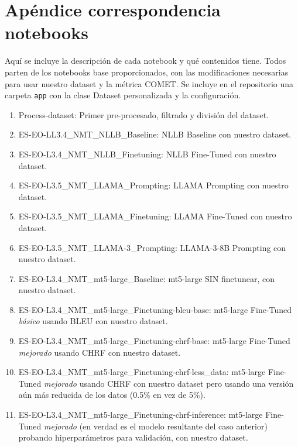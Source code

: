 \documentclass[11pt,spanish,listoffigures,listoftables]{tfgetsinf}
\begin{document}
\chapter{Apéndice correspondencia notebooks}
\label{appendix:notebooks}
Aquí se incluye la descripción de cada notebook y qué contenidos tiene. Todos parten de los notebooks base proporcionados, con las modificaciones necesarias para usar nuestro dataset y la métrica COMET. Se incluye en el repositorio una carpeta \texttt{app} con la clase Dataset personalizada y la configuración.
\begin{enumerate}
	\item Process-dataset: Primer pre-procesado, filtrado y división del dataset.
	\item ES-EO-LL3.4\_NMT\_NLLB\_Baseline: NLLB Baseline con nuestro dataset.
	\item ES-EO-L3.4\_NMT\_NLLB\_Finetuning: NLLB Fine-Tuned con nuestro dataset.
	\item ES-EO-L3.5\_NMT\_LLAMA\_Prompting: LLAMA Prompting con nuestro dataset.
	\item ES-EO-L3.5\_NMT\_LLAMA\_Finetuning: LLAMA Fine-Tuned con nuestro dataset.
	\item ES-EO-L3.5\_NMT\_LLAMA-3\_Prompting: LLAMA-3-8B Prompting con nuestro dataset.
	\item ES-EO-L3.4\_NMT\_mt5-large\_Baseline: mt5-large SIN finetunear, con nuestro dataset.
	\item ES-EO-L3.4\_NMT\_mt5-large\_Finetuning-bleu-base: mt5-large Fine-Tuned \textit{básico} usando BLEU con nuestro dataset.
	\item ES-EO-L3.4\_NMT\_mt5-large\_Finetuning-chrf-base: mt5-large Fine-Tuned \textit{mejorado} usando CHRF con nuestro dataset.
	\item ES-EO-L3.4\_NMT\_mt5-large\_Finetuning-chrf-less\_data: mt5-large Fine-Tuned \textit{mejorado} usando CHRF con nuestro dataset pero usando una versión aún más reducida de los datos (0.5\% en vez de 5\%).
	\item ES-EO-L3.4\_NMT\_mt5-large\_Finetuning-chrf-inference: mt5-large Fine-Tuned \textit{mejorado} (en verdad es el modelo resultante del caso anterior) probando hiperparámetros para validación, con nuestro dataset.
\end{enumerate}


\end{document}
